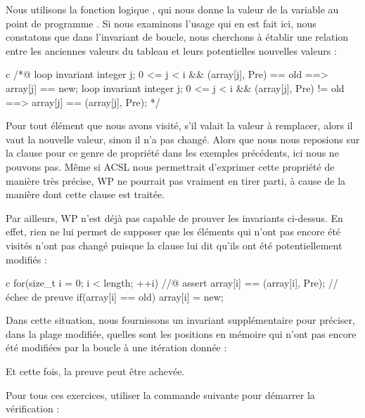 

Nous utilisons la fonction logique , qui
nous donne la valeur de la variable  au point de programme
. Si nous examinons l'usage qui en est fait ici, nous
constatons que dans l'invariant de boucle, nous cherchons à établir une relation
entre les anciennes valeurs du tableau et leurs potentielles nouvelles valeurs :


\begin{CodeBlock}{c}
/*@
  loop invariant \forall integer j; 0 <= j < i && \at(array[j], Pre) == old
                   ==> array[j] == new;
  loop invariant \forall integer j; 0 <= j < i && \at(array[j], Pre) != old
                   ==> array[j] == \at(array[j], Pre);
*/
\end{CodeBlock}


Pour tout élément que nous avons visité, s'il valait la valeur à
remplacer, alors il vaut la nouvelle valeur, sinon il n'a pas changé. Alors que
nous nous reposions sur la clause  pour ce genre de propriété
dans les exemples précédents, ici nous ne pouvons pas. Même si ACSL nous
permettrait d'exprimer cette propriété de manière très précise, WP ne pourrait
pas vraiment en tirer parti, à cause de la manière dont cette clause est traitée.


Par ailleurs, WP n'est déjà pas capable de prouver les invariants ci-dessus. En
effet, rien ne lui permet de supposer que les éléments qui n'ont pas encore été
visités n'ont pas changé puisque la clause  lui dit qu'ils
ont été potentiellement modifiés :


\begin{CodeBlock}{c}
for(size_t i = 0; i < length; ++i){
    //@ assert array[i] == \at(array[i], Pre); // échec de preuve
    if(array[i] == old) array[i] = new;
}
\end{CodeBlock}


Dans cette situation, nous fournissons un  invariant supplémentaire pour
préciser, dans la plage modifiée, quelles sont les positions en mémoire qui
n'ont pas encore été modifiées par la boucle à une itération donnée :




Et cette fois, la preuve peut être achevée.




Pour tous ces exercices, utiliser la commande suivante pour démarrer la vérification :

